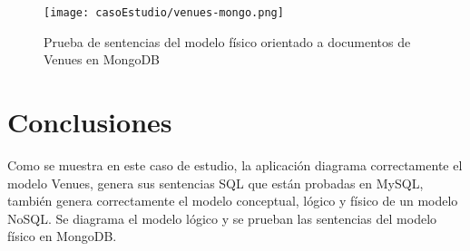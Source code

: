 \begin{figure}[H]
    \centering
    \texttt{[image: casoEstudio/venues-mongo.png]}
    \caption{Prueba de sentencias del modelo físico orientado a documentos de Venues en MongoDB}
    \label{img:venues-mongo}
\end{figure}

\section{Conclusiones}
Como se muestra en este caso de estudio, la aplicación diagrama correctamente el modelo Venues, genera sus sentencias SQL que están probadas en MySQL, también genera correctamente el modelo conceptual, lógico y físico de un modelo NoSQL. Se diagrama el modelo lógico y se prueban las sentencias del modelo físico en MongoDB.

